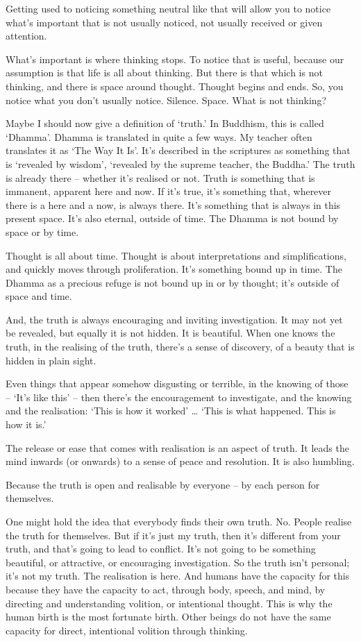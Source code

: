 Getting used to noticing something neutral like that will allow you to notice
what's important that is not usually noticed, not usually received or given
attention.

What's important is where thinking stops. To notice that is useful, because our
assumption is that life is all about thinking. But there is that which is not
thinking, and there is space around thought. Thought begins and ends. So, you
notice what you don't usually notice. Silence. Space. What is not thinking?

Maybe I should now give a definition of `truth.' In Buddhism, this is called
`Dhamma'. Dhamma is translated in quite a few ways. My teacher often translates
it as `The Way It Is'. It's described in the scriptures as something that is
`revealed by wisdom', `revealed by the supreme teacher, the Buddha.' The truth
is already there -- whether it's realised or not. Truth is something that is
immanent, apparent here and now. If it's true, it's something that, wherever
there is a here and a now, is always there. It's something that is always in this
present space. It's also eternal, outside of time. The Dhamma is not bound by
space or by time.

Thought is all about time. Thought is about interpretations and simplifications,
and quickly moves through proliferation. It's something bound up in time. The
Dhamma as a precious refuge is not bound up in or by thought; it's outside of
space and time.

And, the truth is always encouraging and inviting investigation. It may not
yet be revealed, but equally it is not hidden. It is beautiful. When one knows
the truth, in the realising of the truth, there's a sense of discovery, of a
beauty that is hidden in plain sight.

Even things that appear somehow disgusting or terrible, in the knowing of those
-- `It's like this' -- then there's the encouragement to investigate, and the
knowing and the realisation: `This is how it worked' \ldots{} `This is what
happened. This is how it is.'

The release or ease that comes with realisation is an aspect of truth. It leads
the mind inwards (or onwards) to a sense of peace and resolution. It is also
humbling.

Because the truth is open and realisable by everyone -- by each person for
themselves.

One might hold the idea that everybody finds their own truth. No. People realise
the truth for themselves. But if it's just my truth, then it's different from
your truth, and that's going to lead to conflict. It's not going to be something
beautiful, or attractive, or encouraging investigation. So the truth isn't
personal; it's not my truth. The realisation is here. And humans have the
capacity for this because they have the capacity to act, through body, speech, and
mind, by directing and understanding volition, or intentional thought. This is
why the human birth is the most fortunate birth. Other beings do not have the
same capacity for direct, intentional volition through thinking.

